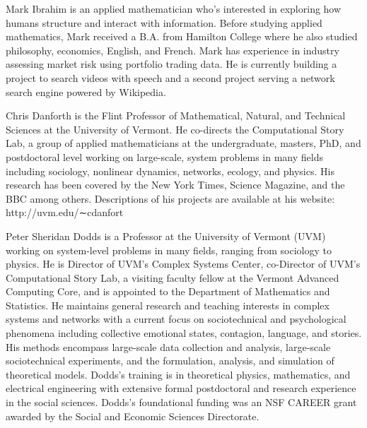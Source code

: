 \documentclass[11pt]{article}
\begin{document}
\sffamily 



\bigskip
\bigskip

Mark Ibrahim is an applied mathematician who's interested in exploring how humans structure and interact with information. Before studying applied mathematics, Mark received a B.A. from Hamilton College where he also studied philosophy, economics, English, and French. Mark has experience in industry assessing market risk using portfolio trading data. He is currently building a project to search videos with speech and a second project serving a network search engine powered by Wikipedia.

Chris Danforth is the Flint Professor of Mathematical, Natural, and Technical Sciences at the University of Vermont. He co-directs the Computational Story Lab, a group of applied mathematicians at the undergraduate, masters, PhD, and postdoctoral level working on large-scale, system problems in many fields including sociology, nonlinear dynamics, networks, ecology, and physics. His research has been covered by the New York Times, Science Magazine, and the BBC among others. Descriptions of his projects are available at his website: http://uvm.edu/∼cdanfort

Peter Sheridan Dodds is a Professor at the University of Vermont (UVM) working on system-level problems in many fields, ranging from sociology to physics. He is Director of UVM's Complex Systems Center, co-Director of UVM's Computational Story Lab, a visiting faculty fellow at the Vermont Advanced Computing Core, and is appointed to the Department of Mathematics and Statistics. He maintains general research and teaching interests in complex systems and networks with a current focus on sociotechnical and psychological phenomena including collective emotional states, contagion, language, and stories. His methods encompass large-scale data collection and analysis, large-scale sociotechnical experiments, and the formulation, analysis, and simulation of theoretical models. Dodds's training is in theoretical physics, mathematics, and electrical engineering with extensive formal postdoctoral and research experience in the social sciences. Dodds's foundational funding was an  NSF CAREER grant awarded by the Social and Economic Sciences Directorate.



\end{document}
